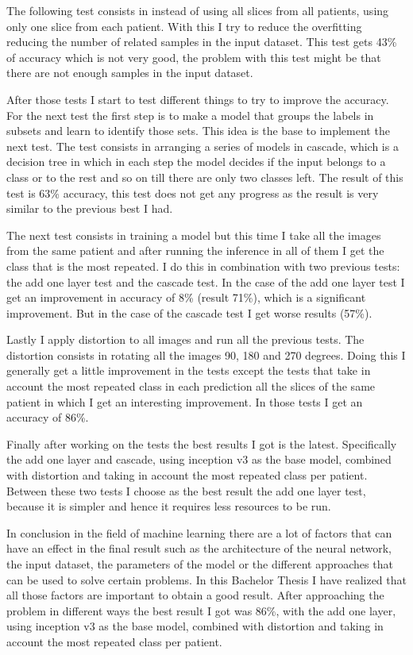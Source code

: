 \documentclass[12pt,a4paper]{article}
\begin{document}
The following test consists in instead of using all slices from all patients, using only one slice from each patient. With this I try to reduce the overfitting reducing the number of related samples in the input dataset. This test gets 43\% of accuracy which is not very good, the problem with this test might be that there are not enough samples in the input dataset.
\bigskip

After those tests I start to test different things to try to improve the accuracy. For the next test the first step is to make a model that groups the labels in subsets and learn to identify those sets. This idea is the base to implement the next test. The test consists in arranging a series of models in cascade, which is a decision tree in which in each step the model decides if the input belongs to a class or to the rest and so on till there are only two classes left. The result of this test is 63\% accuracy, this test does not get any progress as the result is very similar to the previous best I had.
\bigskip

The next test consists in training a model but this time I take all the images from the same patient and after running the inference in all of them I get the class that is the most repeated. I do this in combination with two previous tests: the add one layer test and the cascade test. In the case of the add one layer test I get an improvement in accuracy of 8\% (result 71\%), which is a significant improvement. But in the case of the cascade test I get worse results (57\%).
\bigskip

Lastly I apply distortion to all images and run all the previous tests. The distortion consists in rotating all the images 90, 180 and 270 degrees. Doing this I generally get a little improvement in the tests except the tests that take in account the most repeated class in each prediction all the slices of the same patient in which I get an interesting improvement. In those tests I get an accuracy of 86\%.
\bigskip

Finally after working on the tests the best results I got is the latest. Specifically the add one layer and cascade, using inception v3 as the base model, combined with distortion and taking in account the most repeated class per patient. Between these two tests I choose as the best result the add one layer test, because it is simpler and hence it requires less resources to be run.
\bigskip

In conclusion in the field of machine learning there are a lot of factors that can have an effect in the final result such as the architecture of the neural network, the input dataset, the parameters of the model or the different approaches that can be used to solve certain problems. In this Bachelor Thesis I have realized that all those factors are important to obtain a good result. After approaching the problem in different ways the best result I got was 86\%, with the add one layer, using inception v3 as the base model, combined with distortion and taking in account the most repeated class per patient.
\bigskip
\end{document}
